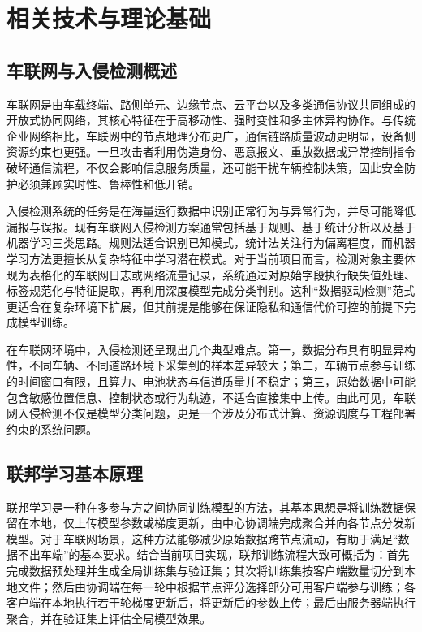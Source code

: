 \chapter{相关技术与理论基础}
\label{cha:related-technology}

\section{车联网与入侵检测概述}
\label{sec:related-vanet-ids}

车联网是由车载终端、路侧单元、边缘节点、云平台以及多类通信协议共同组成的开放式协同网络，其核心特征在于高移动性、强时变性和多主体异构协作。与传统企业网络相比，车联网中的节点地理分布更广，通信链路质量波动更明显，设备侧资源约束也更强。一旦攻击者利用伪造身份、恶意报文、重放数据或异常控制指令破坏通信流程，不仅会影响信息服务质量，还可能干扰车辆控制决策，因此安全防护必须兼顾实时性、鲁棒性和低开销\cite{placeholder_iov_security_survey,placeholder_vanet_ids_survey}。

入侵检测系统的任务是在海量运行数据中识别正常行为与异常行为，并尽可能降低漏报与误报。现有车联网入侵检测方案通常包括基于规则、基于统计分析以及基于机器学习三类思路。规则法适合识别已知模式，统计法关注行为偏离程度，而机器学习方法更擅长从复杂特征中学习潜在模式。对于当前项目而言，检测对象主要体现为表格化的车联网日志或网络流量记录，系统通过对原始字段执行缺失值处理、标签规范化与特征提取，再利用深度模型完成分类判别。这种“数据驱动检测”范式更适合在复杂环境下扩展，但其前提是能够在保证隐私和通信代价可控的前提下完成模型训练。

在车联网环境中，入侵检测还呈现出几个典型难点。第一，数据分布具有明显异构性，不同车辆、不同道路环境下采集到的样本差异较大；第二，车辆节点参与训练的时间窗口有限，且算力、电池状态与信道质量并不稳定；第三，原始数据中可能包含敏感位置信息、控制状态或行为轨迹，不适合直接集中上传。由此可见，车联网入侵检测不仅是模型分类问题，更是一个涉及分布式计算、资源调度与工程部署约束的系统问题。

\section{联邦学习基本原理}
\label{sec:related-federated-learning}

联邦学习是一种在多参与方之间协同训练模型的方法，其基本思想是将训练数据保留在本地，仅上传模型参数或梯度更新，由中心协调端完成聚合并向各节点分发新模型\cite{placeholder_federated_learning_survey,placeholder_fedavg}。对于车联网场景，这种方法能够减少原始数据跨节点流动，有助于满足“数据不出车端”的基本要求。结合当前项目实现，联邦训练流程大致可概括为：首先完成数据预处理并生成全局训练集与验证集；其次将训练集按客户端数量切分到本地文件；然后由协调端在每一轮中根据节点评分选择部分可用客户端参与训练；各客户端在本地执行若干轮梯度更新后，将更新后的参数上传；最后由服务器端执行聚合，并在验证集上评估全局模型效果。

